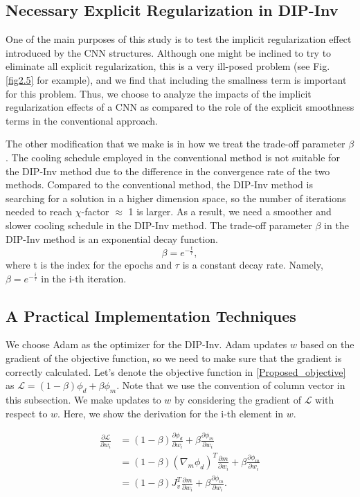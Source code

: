 \documentclass[lettersize,journal]{IEEEtran}
\begin{document}
\subsection{Necessary Explicit Regularization in DIP-Inv}
One of the main purposes of this study is to test the implicit regularization effect introduced by the CNN structures. Although one might be inclined to try to eliminate all explicit regularization, this is a very ill-posed problem (see Fig. \ref{fig2.5} for example), and we find that including the smallness term is important for this problem. Thus, we choose to analyze the impacts of the implicit regularization effects of a CNN as compared to the role of the explicit smoothness terms in the conventional approach.

The other modification that we make is in how we treat the trade-off parameter $\beta$. The cooling schedule employed in the conventional method is not suitable for the DIP-Inv method due to the difference in the convergence rate of the two methods. Compared to the conventional method, the DIP-Inv method is searching for a solution in a higher dimension space, so the number of iterations needed to reach $\chi$-factor $\approx$ 1 is larger. As a result, we need a smoother and slower cooling schedule in the DIP-Inv method.
The trade-off parameter $\beta$ in the DIP-Inv method is an exponential decay function. 
\begin{equation}
\label{dacay_curve}
\beta = e^{-\frac{t}{\tau}},
\end{equation}
where t is the index for the epochs and $\tau$ is a constant decay rate. Namely, $\beta = e^{-\frac{i}{\tau}}$ in the i-th iteration. 

\subsection{A Practical Implementation Techniques}
We choose Adam \cite{ref22} as the optimizer for the DIP-Inv. Adam updates $w$ based on the gradient of the objective function, so we need to make sure that the gradient is correctly calculated. 
Let's denote the objective function in \ref{Proposed_objective} as $\mathcal{L} = (1-\beta) \phi_d + \beta \phi_m$. Note that we use the convention of column vector in this subsection. We make updates to $w$ by considering the gradient of $\mathcal{L}$ with respect to $w$. Here, we show the derivation for the i-th element in $w$.

\begin{equation}
    \begin{split}
        \frac{\partial \mathcal{L}}{\partial w_i} &= (1-\beta) \frac{\partial \phi_d}{\partial w_i} + \beta \frac{\partial \phi_m}{\partial w_i}
        \\
        &= (1-\beta) (\nabla_m \phi_d)^T \frac{\partial m}{\partial w_i} + \beta \frac{\partial \phi_m}{\partial w_i}
        \\
        &= (1-\beta)J_v^T \frac{\partial m}{\partial w_i} + \beta \frac{\partial \phi_m}{\partial w_i}
        .\\
    \end{split}
\end{equation}
\end{document}
